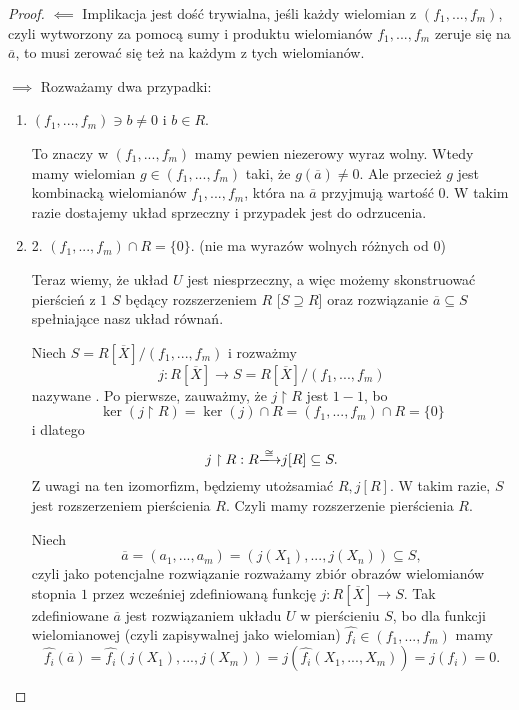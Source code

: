 \begin{proof}

$\impliedby$ Implikacja jest dość trywialna, jeśli każdy wielomian z $(f_1,...,f_m)$, czyli wytworzony za pomocą sumy i produktu wielomianów $f_1,...,f_m$ zeruje się na $\overline a$, to musi zerować się też na każdym z tych wielomianów.

$\implies$ Rozważamy dwa przypadki:

\begin{enumerate}
    \item $(f_1,...,f_m)\ni b\neq 0$ i $b\in R$. 

    To znaczy w $(f_1,...,f_m)$ mamy pewien niezerowy wyraz wolny. Wtedy mamy wielomian $g\in(f_1,...,f_m)$ taki, że $g(\overline a)\neq 0$. Ale przecież $g$ jest kombinacką wielomianów $f_1,...,f_m$, która na $\overline a$ przyjmują wartość $0$. W takim razie dostajemy układ sprzeczny i przypadek jest do odrzucenia.

    \item 2. $(f_1,...,f_m)\cap R=\{0\}$. (nie ma wyrazów wolnych różnych od $0$)

    Teraz wiemy, że układ $U$ jest niesprzeczny, a więc możemy skonstruować pierścień z $1$ $S$ będący rozszerzeniem $R$ [$S\supseteq R$] oraz rozwiązanie $\overline a\subseteq S$ spełniające nasz układ równań.

    Niech $S=R[\overline X]/(f_1,...,f_m)$ i rozważmy
    $$j:R[\overline X]\to S=R[\overline{X}]/(f_1,...,f_m)$$
    nazywane . Po pierwsze, zauważmy, że  $j\restriction R$ jest $1-1$, bo
    $$\ker(j\restriction R)=\ker(j)\cap R=(f_1,...,f_m)\cap R=\{0\}$$
    i dlatego
    $$j\restriction R:R\isomorphism j[R]\subseteq S.$$
    Z uwagi na ten izomorfizm, będziemy utożsamiać $R, j[R]$. W takim razie, $S$ jest rozszerzeniem pierścienia $R$. Czyli mamy rozszerzenie pierścienia $R$.

    Niech 
    $$\overline a=(a_1,...,a_m)=(j(X_1),...,j(X_n))\subseteq S,$$
    czyli jako potencjalne rozwiązanie rozważamy zbiór obrazów wielomianów stopnia $1$ przez wcześniej zdefiniowaną funkcję $j:R[\overline X]\to S$. Tak zdefiniowane $\overline a$ jest rozwiązaniem układu $U$ w pierścieniu $S$, bo dla funkcji wielomianowej (czyli zapisywalnej jako wielomian) $\hat{f_i}\in(f_1,...,f_m)$ mamy
$$\hat{f_i}(\overline a)=\hat{f_i}(j(X_1),...,j(X_m))=j(\hat{f_i}(X_1,...,X_m))=j(f_i)=0.$$
\end{enumerate}

\end{proof}
